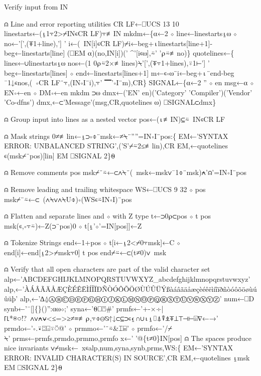 \documentclass{article}%
\begin{document}
         \LA{}Verify input from \code{}IN\edoc{}~{\nwtagstyle{}}\RA{}

⍝ Line and error reporting utilities
         CR LF←⎕UCS 13 10
         linestarts←(⍸1⍪2>⌿IN∊CR LF)⍪≢IN
         mkdm←\{⍺←2 ⋄ line←linestarts⍸⍵ ⋄ no←'[',(⍕1+line),'] '
                 i←(~IN[i]∊CR LF)⌿i←beg+⍳linestarts[line+1]-beg←linestarts[line]
                 (⎕EM ⍺)(no,IN[i])(' ^'[i∊⍵],⍨' '⍴⍨≢no)\}
         quotelines←\{
                 lines←∪linestarts⍸⍵
                 nos←(1 0⍴⍨2×≢lines)⍀'[',(⍕⍪1+lines),⍤1⊢'] '
                 beg←linestarts[lines] ⋄ end←linestarts[lines+1]
                 m←∊∘⍵¨i←beg+⍳¨end-beg
                 ¯1↓∊nos,(~∘CR LF¨⍪,(IN∘I¨i),⍪' ▔'∘I¨m),CR\}
         SIGNAL←\{⍺←2 '' ⋄ en msg←⍺ ⋄ EN∘←en ⋄ DM∘←en mkdm ⊃⍵
                 dmx←('EN' en)('Category' 'Compiler')('Vendor' 'Co-dfns')
                 dmx,←⊂'Message'(msg,CR,quotelines ⍵)
                 ⎕SIGNAL⊂dmx\}

⍝ Group input into lines as a nested vector
         pos←(⍳≢IN)⊆⍨~IN∊CR LF

⍝ Mask strings
         0≠≢lin←⍸⊃∘⌽¨msk←≠⍀¨''''=IN∘I¨pos:\{
                 EM←'SYNTAX ERROR: UNBALANCED STRING',('S'⌿⍨2≤≢lin),CR
                 EM,←quotelines ∊(msk⌿¨pos)[lin]
                 EM ⎕SIGNAL 2\}⍬

⍝ Remove comments
         pos msk⌿¨⍨←⊂∧⍀¨(~msk←msk∨¯1⌽¨msk)⍲'⍝'=IN∘I¨pos

⍝ Remove leading and trailing whitespace
         WS←⎕UCS 9 32 ⋄ pos msk⌿¨⍨←⊂~(∧⍀∨∧⍀U⌽)∘(WS∊⍨IN∘I)¨pos

⍝ Flatten and separate lines and ⋄ with Z type
         t←⊃0⍴⊂pos ⋄ t pos msk(∊,∘⍪⍨)←Z(⊃¨pos)0 ⋄ t[⍸'⋄'=IN[pos]]←Z

⍝ Tokenize Strings
         end←1+pos ⋄ t[i←⍸2<⌿0⍪msk]←C ⋄ end[i]←end[⍸2>⌿msk⍪0]
         t pos end⌿⍨←⊂(t≠0)∨~msk

⍝ Verify that all open characters are part of the valid character set
         alp←'ABCDEFGHIJKLMNOPQRSTUVWXYZ_abcdefghijklmnopqrstuvwxyz'
         alp,←'ÀÁÂÃÄÅÆÇÈÉÊËÌÍÎÏÐÑÒÓÔÕÖØÙÚÛÜÝßàáâãäåæçèéêëìíîïðñòóôõöøùúûüþ'
         alp,←'∆⍙ⒶⒷⒸⒹⒺⒻⒼⒽⒾⒿⓀⓁⓂⓃⓄⓅⓆⓇⓈⓉⓊⓋⓌⓍⓎⓏ'
         num←⎕D
         synb←'¯[]\{\}()'':⍺⍵⋄;'
         syna←'⍬⎕⍞#'
         prmfs←'+-×÷|⌈⌊*⍟○!?~∧∨⍲⍱<≤=>≥≠≡≢⍴,⍪⌽⊖⍉↑↓⊂⊆⊃∊⍷∩∪⍳⍸⌷⍋⍒⍎⍕⊥⊤⊣⊢⌹∇←→'
         prmdo←'∘.⍣⍠⌺⍤⍥@' ⋄ prmmo←'¨⍨&⌶⌸' ⋄ prmfo←'/⌿\\⍀'
         prms←prmfs,prmdo,prmmo,prmfo
         x←' '@\{t≠0\}IN[pos] ⍝ The spaces produce nice invariants
         ∨⌿msk←~x∊alp,num,syna,synb,prms,WS:\{
                 EM←'SYNTAX ERROR: INVALID CHARACTER(S) IN SOURCE',CR
                 EM,←quotelines ⍸msk
                 EM ⎕SIGNAL 2\}⍬
\end{document}
